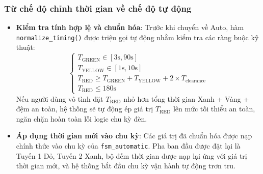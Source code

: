 \subsubsection{Từ chế độ chỉnh thời gian về chế độ tự động}
\begin{itemize}
    \item \textbf{Kiểm tra tính hợp lệ và chuẩn hóa}: Trước khi chuyển về Auto, hàm \texttt{normalize\_timing()} được triệu gọi tự động nhằm kiểm tra các ràng buộc kỹ thuật:
    \begin{equation}
        \begin{cases}
            T_{\text{GREEN}} \in [3\text{s}, 90\text{s}] \\
            T_{\text{YELLOW}} \in [1\text{s}, 10\text{s}] \\
            T_{\text{RED}} \ge T_{\text{GREEN}} + T_{\text{YELLOW}} + 2 \times T_{\text{clearance}} \\
            T_{\text{RED}} \le 180\text{s}
        \end{cases}
    \end{equation}
    Nếu người dùng vô tình đặt $T_{\text{RED}}$ nhỏ hơn tổng thời gian Xanh + Vàng + đệm an toàn, hệ thống sẽ tự động ép giá trị $T_{\text{RED}}$ lên mức tối thiểu an toàn, ngăn chặn hoàn toàn lỗi logic chu kỳ đèn.
    \item \textbf{Áp dụng thời gian mới vào chu kỳ}: Các giá trị đã chuẩn hóa được nạp chính thức vào chu kỳ của \texttt{fsm\_automatic}. Pha ban đầu được đặt lại là Tuyến 1 Đỏ, Tuyến 2 Xanh, bộ đếm thời gian được nạp lại ứng với giá trị thời gian mới, và hệ thống bắt đầu chu kỳ vận hành tự động trơn tru.
\end{itemize}
